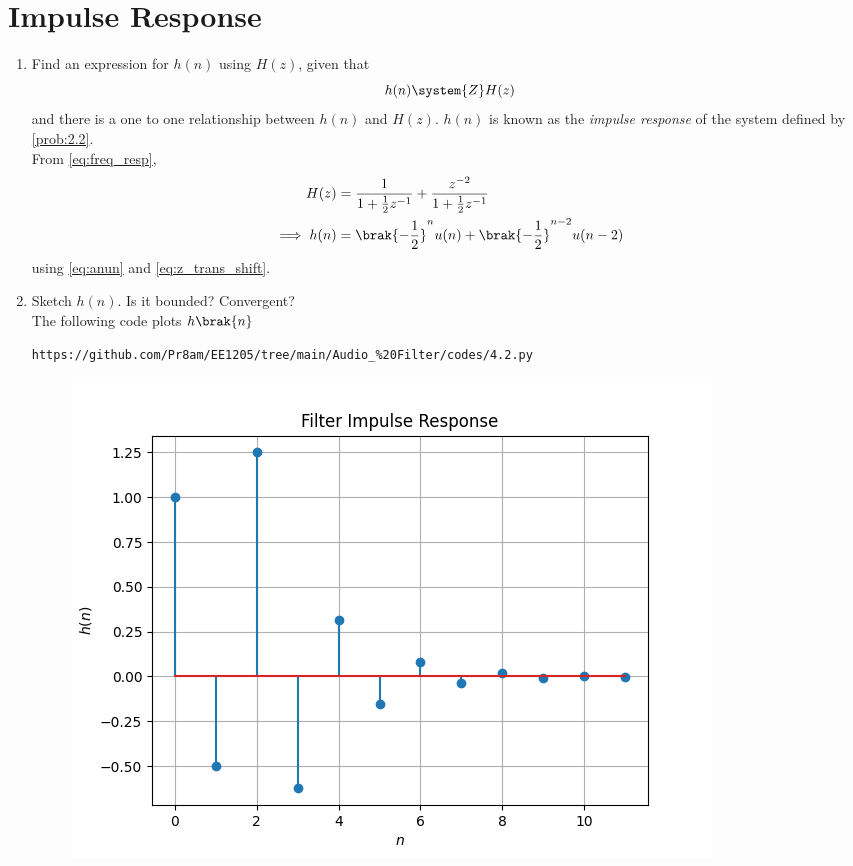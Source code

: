 \documentclass[journal,12pt,twocolumn]{IEEEtran}
\theoremstyle{remark}
\begin{document}
\section{Impulse Response}
\begin{enumerate}[label=\thesection.\arabic*]
\item \label{prob:impulse_resp}
Find an expression for $h(n)$ using $H(z)$, given that 
\begin{equation}
\label{eq:impulse_resp}
h(n) \system{Z} H(z)
\end{equation}
and there is a one to one relationship between $h(n)$ and $H(z)$. $h(n)$ is known as the {\em impulse response} of the
system defined by \eqref{prob:2.2}.
\\
\solution From \eqref{eq:freq_resp},
\begin{align}
H(z) &= \frac{1}{1 + \frac{1}{2}z^{-1}} + \frac{ z^{-2}}{1 + \frac{1}{2}z^{-1}}
\\
\implies h(n) &= \brak{-\frac{1}{2}}^{n}u(n) + \brak{-\frac{1}{2}}^{n-2}u(n-2)
\end{align}
using \eqref{eq:anun} and \eqref{eq:z_trans_shift}.
\item Sketch $h(n)$. Is it bounded? Convergent? 
\\
\solution The following code plots $h\brak{n}$ 
\begin{lstlisting}
https://github.com/Pr8am/EE1205/tree/main/Audio_%20Filter/codes/4.2.py
\end{lstlisting}
\begin{figure}[H]
\centering
\includegraphics[width=\columnwidth]{figs/hn}

\end{figure}
\end{enumerate}
\end{document}
